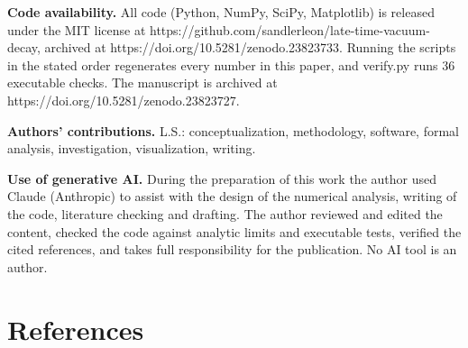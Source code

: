\documentclass[11pt,a4paper]{article}
\begin{document}
\noindent\textbf{Code availability.} All code (Python, NumPy, SciPy, Matplotlib) is released under the MIT license at https://github.com/sandlerleon/late-time-vacuum-decay, archived at https://doi.org/10.5281/zenodo.23823733. Running the scripts in the stated order regenerates every number in this paper, and verify.py runs 36 executable checks. The manuscript is archived at https://doi.org/10.5281/zenodo.23823727.

\noindent\textbf{Authors' contributions.} L.S.: conceptualization, methodology, software, formal analysis, investigation, visualization, writing.

\noindent\textbf{Use of generative AI.} During the preparation of this work the author used Claude (Anthropic) to assist with the design of the numerical analysis, writing of the code, literature checking and drafting. The author reviewed and edited the content, checked the code against analytic limits and executable tests, verified the cited references, and takes full responsibility for the publication. No AI tool is an author.

\section*{References}
\end{document}
